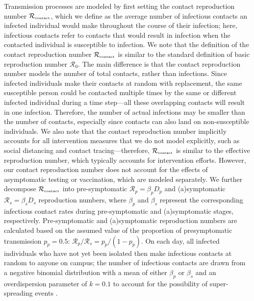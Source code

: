\documentclass[12pt]{article}
\newcommand{\Rx}[1]{\ensuremath{{\mathcal R}_{#1}}}
\newcommand{\Rc}{\Rx{\textrm{\tiny{contact}}}}
\newcommand{\RR}{\ensuremath{{\mathcal R}}}
\begin{document}
Transmission processes are modeled by first setting the contact reproduction number $\Rc$, which we define as the average number of infectious contacts an infected individual would make throughout the course of their infection;
here, infectious contacts refer to contacts that would result in infection when the contacted individual is susceptible to infection.
We note that the definition of the contact reproduction number $\Rc$ is similar to the standard definition of basic reproduction number $\RR_0$.
The main difference is that the contact reproduction number models the number of total contacts, rather than infections. 
Since infected individuals make their contacts at random with replacement, the same susceptible person could be contacted multiple times by the same or different infected individual during a time step---all these overlapping contacts will result in one infection.
Therefore, the number of actual infections may be smaller than the number of contacts, especially since contacts can also land on non-susceptible individuals.
We also note that the contact reproduction number implicitly accounts for all intervention measures that we do not model explicitly, such as social distancing and contact tracing---therefore, $\Rc$ is similar to the effective reproduction number, which typically accounts for intervention efforts.
However, our contact reproduction number does not account for the effects of asymptomatic testing or vaccination, which are modeled separately.
We further decompose $\Rc$ into pre-symptomatic $\mathcal R_p = \beta_p D_p$ and (a)symptomatic $\mathcal R_s = \beta_s D_s$ reproduction numbers, where $\beta_p$ and $\beta_s$ represent the corresponding infectious contact rates during pre-symptomatic and (a)symptomatic stages, respectively. Pre-symptomatic and (a)symptomatic reproduction numbers are calculated based on the assumed value of the proportion of presymptomatic transmission $p_p = 0.5$: $\mathcal R_p/\mathcal R_s = p_p/(1 - p_p)$.
On each day, all infected individuals who have not yet been isolated then make infectious contacts at random to anyone on campus; the number of infectious contacts are drawn from a negative binomial distribution with a mean of either $\beta_p$ or $\beta_s$ and an overdispersion parameter of $k=0.1$ to account for the possibility of super-spreading events \citep{10.12688/wellcomeopenres.15842.3}.
\end{document}
